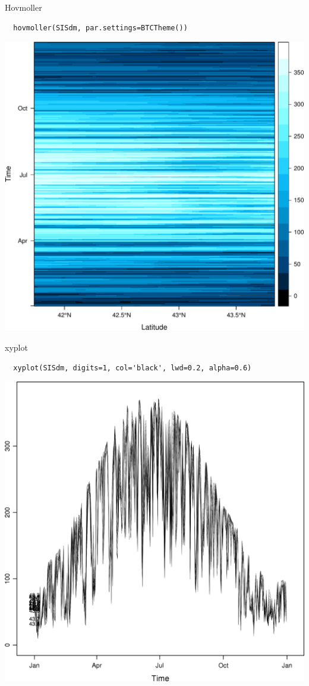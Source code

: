 \documentclass[xcolor={usenames,svgnames,dvipsnames}]{beamer}
\begin{document}
\begin{frame}[fragile,label=sec-4-4-1]{Hovmoller}
 \lstset{language=R,label= ,caption= ,numbers=none}
\begin{lstlisting}
  hovmoller(SISdm, par.settings=BTCTheme())
\end{lstlisting}
\includegraphics[width=.9\linewidth]{figs/SISdm_hovmoller_lat.pdf}
\end{frame}

\begin{frame}[fragile,label=sec-4-4-2]{xyplot}
 \lstset{language=R,label= ,caption= ,numbers=none}
\begin{lstlisting}
  xyplot(SISdm, digits=1, col='black', lwd=0.2, alpha=0.6)
\end{lstlisting}

\includegraphics[width=.9\linewidth]{figs/SISmm_xyplot.png}
\end{frame}
\end{document}
